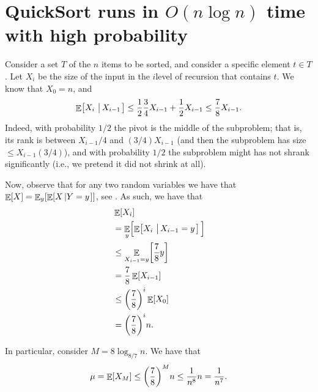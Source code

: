 %



\ChapterPrefix{}
\ChapterGen{}





\section{QuickSort{} runs in $O(n \log n)$ time with high
   probability}

Consider a set $T$ of the $n$ items to be sorted, and consider a
specific element $t \in T$. Let $X_i$ be the size of the input in the
$i$\th level of recursion that contains $t$. We know that $X_0 = n$,
and
\begin{align*}
    \Ex{X_i \sep{ X_{i-1}}}%
    \leq%
    \frac{1}{2} \frac{3}{4} X_{i-1} + \frac{1}{2} X_{i-1}%
    \leq%
    \frac{7}{8} X_{i-1}.
\end{align*}
Indeed, with probability $1/2$ the pivot is the middle of the
subproblem; that is, its rank is between $X_{i-1}/4$ and
$(3/4)X_{i-1}$ (and then the subproblem has size $\leq X_{i-1}(3/4)$),
and with probability $1/2$ the subproblem might has not shrank
significantly (i.e., we pretend it did not shrink at all).

Now, observe that for any two random variables we have that
$\mathop{\mathbb{E}}\!\left[ {X  } \right] = \mathop{\mathbb{E}}_{y}\!\left[ {\mathop{\mathbb{E}}\!\left[ {X\left|  {Y=y}
      \right.} \right] } \right]$, see . As
such, we have that
\begin{align*}
    &\Ex{X_i \MakeBig }
    \\&=
    \ExExt{y}{\Ex{X_i\sep{X_{i-1}=y}}\Bigl. }
    \\&\leq
    \ExExt{X_{i-1}=y}{ \frac{7}{8} y }
    \\&=
    \frac{7}{8} \Ex{X_{i-1}\MakeBig }
    \\&\leq
    \pth{\frac{7}{8}}^i \Ex{X_0}
    \\&=
    \pth{\frac{7}{8}}^i n.
\end{align*}

In particular, consider $M = 8 \log_{8/7} n$. We have that
\begin{align*}
    \mu%
    =%
    \Ex{\MakeBig X_M}%
    \leq%
    \pth{\frac{7}{8}}^M n%
    \leq%
    \frac{1}{n^8} n%
    =%
    \frac{1}{n^7}.
\end{align*}

